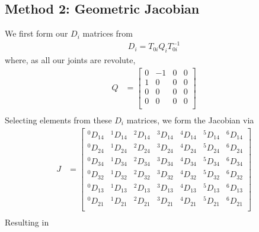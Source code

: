 \documentclass{article}
\begin{document}
\subsection{Method 2: Geometric Jacobian}
We first form our $D_i$ matrices from
\begin{align*}
D_i = T_{0i} Q_i T_{0i}^{-1}
\end{align*}
where, as all our joints are revolute,
\begin{align*}
Q &=
\left[\begin{matrix}
    0 & -1 & 0 & 0 \\
    1 &  0 & 0 & 0 \\
    0 &  0 & 0 & 0 \\
    0 &  0 & 0 & 0 \\
\end{matrix}\right] \\
\end{align*}
Selecting elements from these $D_i$ matrices, we form the Jacobian via
\begin{align*}
J &=
\left[\begin{matrix}
^0D_{14} & ^1D_{14} & ^2D_{14} & ^3D_{14} & ^4D_{14} & ^5D_{14} & ^6D_{14} \\
^0D_{24} & ^1D_{24} & ^2D_{24} & ^3D_{24} & ^4D_{24} & ^5D_{24} & ^6D_{24} \\
^0D_{34} & ^1D_{34} & ^2D_{34} & ^3D_{34} & ^4D_{34} & ^5D_{34} & ^6D_{34} \\
^0D_{32} & ^1D_{32} & ^2D_{32} & ^3D_{32} & ^4D_{32} & ^5D_{32} & ^6D_{32} \\
^0D_{13} & ^1D_{13} & ^2D_{13} & ^3D_{13} & ^4D_{13} & ^5D_{13} & ^6D_{13} \\
^0D_{21} & ^1D_{21} & ^2D_{21} & ^3D_{21} & ^4D_{21} & ^5D_{21} & ^6D_{21} \\
\end{matrix}\right] \\
\end{align*}
Resulting in
\end{document}
